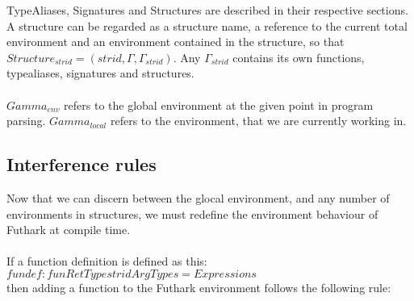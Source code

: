 TypeAliases, Signatures and Structures are described in their respective
sections. A structure can be regarded as a structure name, a reference to the
current total environment and an environment contained in the structure, so that
$Structure_{strid} = (strid, \Gamma,  \Gamma_{strid})$. Any $\Gamma_{strid}$
contains its own functions, typealiases, signatures and structures.\\
\\
$Gamma_{env}$ refers to the global environment at the given point in program
parsing.
$Gamma_{local}$ refers to the environment, that we are currently working in.

\subsection{Interference rules}
Now that we can discern between the glocal environment, and any number of
environments in structures, we must redefine the environment behaviour of Futhark at compile time.
\\
\\
If a function definition is defined as this:
\\
$fundef : fun RetType strid ArgTypes = Expressions$
\\ then adding a function to the Futhark environment follows the following rule:
\begin{prooftree}
\end{prooftree}
  \\
